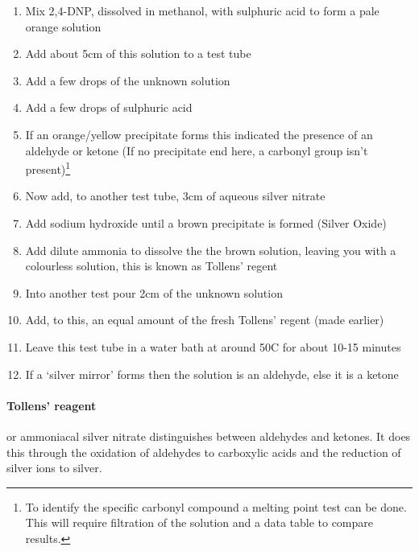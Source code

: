 	\begin{enumerate}
		\item Mix 2,4-DNP, dissolved in methanol, with sulphuric acid to form a pale orange solution
		
		\item Add about 5cm of this solution to a test tube
		
		\item Add a few drops of the unknown solution
		
		\item Add a few drops of sulphuric acid
		
		\item If an orange/yellow precipitate forms this indicated the presence of an aldehyde or ketone (If no precipitate end here, a carbonyl group isn't present)\footnote{To identify the specific carbonyl compound a melting point test can be done. This will require filtration of the solution and a data table to compare results.}
		
		\item Now add, to another test tube, 3cm of aqueous silver nitrate
		
		\item Add sodium hydroxide until a brown precipitate is formed (Silver Oxide)
		
		\item Add dilute ammonia to dissolve the the brown solution, leaving you with a colourless solution, this is known as Tollens' regent
		
		\item Into another test pour 2cm of the unknown solution
		
		\item Add, to this, an equal amount of the fresh Tollens' regent (made earlier)
		
		\item Leave this test tube in a water bath at around 50\degree C for about 10-15 minutes
		
		\item If a `silver mirror' forms then the solution is an aldehyde, else it is a ketone
	\end{enumerate}
	
	\paragraph{Tollens' reagent} or ammoniacal silver nitrate distinguishes between aldehydes and ketones. It does this through the oxidation of aldehydes to carboxylic acids and the reduction of silver ions to silver.
	
